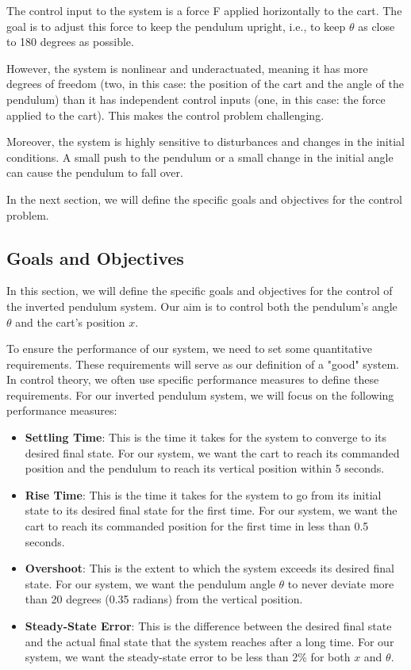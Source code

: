 \documentclass[11pt,twocolumn,twoside,lineno]{pnas-new}
\begin{document}
The control input to the system is a force F applied horizontally to the cart. The goal is to adjust this force to keep the pendulum upright, i.e., to keep $\theta$ as close to 180 degrees as possible. 

However, the system is nonlinear and underactuated, meaning it has more degrees of freedom (two, in this case: the position of the cart and the angle of the pendulum) than it has independent control inputs (one, in this case: the force applied to the cart). This makes the control problem challenging.

Moreover, the system is highly sensitive to disturbances and changes in the initial conditions. A small push to the pendulum or a small change in the initial angle can cause the pendulum to fall over. 

In the next section, we will define the specific goals and objectives for the control problem.



\subsection{Goals and Objectives}
In this section, we will define the specific goals and objectives for the control of the inverted pendulum system. Our aim is to control both the pendulum's angle $\theta$ and the cart's position $x$.

To ensure the performance of our system, we need to set some quantitative requirements. These requirements will serve as our definition of a "good" system. In control theory, we often use specific performance measures to define these requirements. For our inverted pendulum system, we will focus on the following performance measures:

\begin{itemize}
    \item \textbf{Settling Time}: This is the time it takes for the system to converge to its desired final state. For our system, we want the cart to reach its commanded position and the pendulum to reach its vertical position within 5 seconds.
    \item \textbf{Rise Time}: This is the time it takes for the system to go from its initial state to its desired final state for the first time. For our system, we want the cart to reach its commanded position for the first time in less than 0.5 seconds.
    \item \textbf{Overshoot}: This is the extent to which the system exceeds its desired final state. For our system, we want the pendulum angle $\theta$ to never deviate more than 20 degrees (0.35 radians) from the vertical position.
    \item \textbf{Steady-State Error}: This is the difference between the desired final state and the actual final state that the system reaches after a long time. For our system, we want the steady-state error to be less than 2\% for both $x$ and $\theta$.
\end{itemize}
\end{document}
